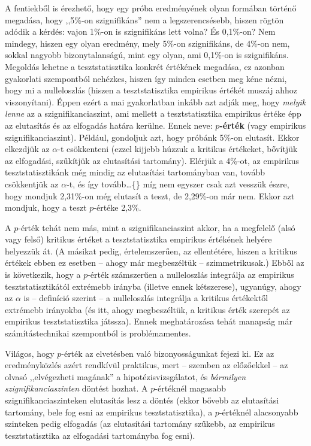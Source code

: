 \documentclass[]{book}
\begin{document}
A fentiekből is érezhető, hogy egy próba eredményének olyan formában történő megadása, hogy ,,5\%-on szignifikáns'' nem a legszerencsésebb, hiszen rögtön adódik a kérdés: vajon 1\%-on is szignifikáns lett volna? És 0,1\%-on? Nem mindegy, hiszen egy olyan eredmény, mely 5\%-on szignifikáns, de 4\%-on nem, sokkal nagyobb bizonytalanságú, mint egy olyan, ami 0,1\%-on is szignifikáns. Megoldás lehetne a tesztstatisztika konkrét értékének megadása, ez azonban gyakorlati szempontból nehézkes, hiszen így minden esetben meg kéne nézni, hogy mi a nulleloszlás (hiszen a tesztstatisztika empirikus értékét muszáj ahhoz viszonyítani). Éppen ezért a mai gyakorlatban inkább azt adják meg, hogy \emph{melyik lenne} az a szignifikanciaszint, ami mellett a tesztstatisztika empirikus értéke épp az elutasítás és az elfogadás határa kerülne. Ennek neve: \textbf{\(p\)-érték} (vagy empirikus szignifikanciaszint). Például, gondoljuk azt, hogy próbánk 5\%-on elutasít. Ekkor elkezdjük az \(\alpha\)-t csökkenteni (ezzel kijjebb húzzuk a kritikus értékeket, bővítjük az elfogadási, szűkítjük az elutasítási tartomány). Elérjük a 4\%-ot, az empirikus tesztstatisztikánk még mindig az elutasítási tartományban van, tovább csökkentjük az \(\alpha\)-t, és így tovább\dots\{\} míg nem egyszer csak azt vesszük észre, hogy mondjuk 2,31\%-on még elutasít a teszt, de 2,29\%-on már nem. Ekkor azt mondjuk, hogy a teszt \(p\)-értéke 2,3\%.

A \(p\)-érték tehát nem más, mint a szignifikanciaszint akkor, ha a megfelelő (alsó vagy felső) kritikus értéket a tesztstatisztika empirikus értékének helyére helyezzük át. (A másikat pedig, értelemszerűen, az ellentétére, hiszen a kritikus értékek ebben ez esetben -- ahogy már megbeszéltük -- szimmetrikusak.) Ebből az is következik, hogy a \(p\)-érték számszerűen a nulleloszlás integrálja az empirikus tesztstatisztikától extrémebb irányba (illetve ennek kétszerese), ugyanúgy, ahogy az \(\alpha\) is -- definíció szerint -- a nulleloszlás integrálja a kritikus értékektől extrémebb irányokba (és itt, ahogy megbeszéltük, a kritikus érték szerepét az empirikus tesztstatisztika játssza). Ennek meghatározása tehát manapság már számítástechnikai szempontból is problémamentes.

Világos, hogy \(p\)-érték az elvetésben való bizonyosságunkat fejezi ki. Ez az eredményközlés azért rendkívül praktikus, mert -- szemben az előzőekkel -- az olvasó ,,elvégezheti magának'' a hipotézisvizsgálatot, és \emph{bármilyen szignifikanciaszinten} döntést hozhat. A \(p\)-értéknél magasabb szignifikanciaszinteken elutasítás lesz a döntés (ekkor bővebb az elutasítási tartomány, bele fog esni az empirikus tesztstatisztika), a \(p\)-értéknél alacsonyabb szinteken pedig elfogadás (az elutasítási tartomány szűkebb, az empirikus tesztstatisztika az elfogadási tartományba fog esni).
\end{document}
